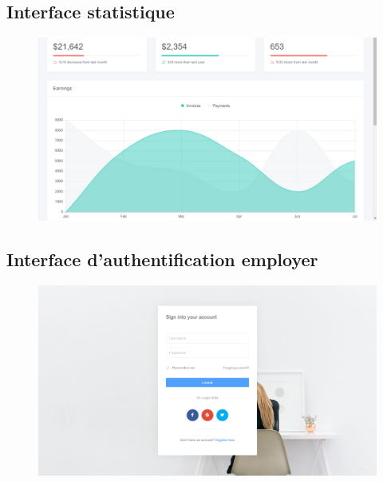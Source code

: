     \subsection[Interface statistique]{Interface statistique}
        \begin{figure}[H]
            \centering
            \includegraphics[width=130mm]{images/presentation-de-la-solution/stat.png}
            \label{fig:mdSysteme}
        \end{figure}    
    \subsection[Interface d’authentification employer]{Interface d’authentification employer}
            \begin{figure}[H]
                \centering
                \includegraphics[width=130mm]{images/presentation-de-la-solution/authentifier.png}
                \label{fig:mdSysteme}
            \end{figure}
